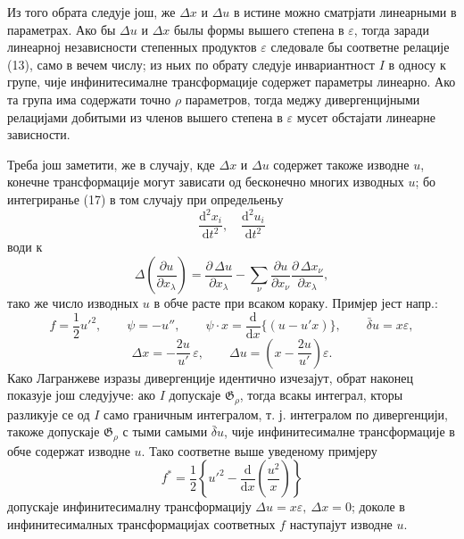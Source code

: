 ﻿\documentclass[11pt]{article}
\providecommand{\G}{\mathfrak G}
\providecommand{\eps}{\varepsilon}
\providecommand{\D}{\Delta}
\providecommand{\p}{\partial}
\providecommand{\dd}{\mathrm d}
\providecommand{\bd}{\bar{\delta}}
\begin{document}
Из того обрата следује још, же \(\D x\) и \(\D u\) в истине можно сматрјати линеарными в параметрах. Ако бы \(\D u\) и \(\D x\) былы формы вышего степена в \(\eps\), тогда заради линеарној независности степенных продуктов \(\eps\) следовале бы соответне релације (13), само в вечем числу; из ньих по обрату следује инвариантност \(I\) в односу к групе, чије инфинитесималне трансформације содержет параметры линеарно. Ако та група има содержати точно \(\rho\) параметров, тогда меджу дивергенцијными релацијами добитыми из членов вышего степена в \(\eps\) мусет обстајати линеарне зависности.

Треба још заметити, же в случају, кде \(\D x\) и \(\D u\) содержет такоже изводне \(u\), конечне трансформације могут зависати од бесконечно многих изводных \(u\); бо интегриранье (17) в том случају при определьеньу
\[
\frac{\dd^2x_i}{\dd t^2},\quad \frac{\dd^2u_i}{\dd t^2}
\]
води к
\[
\D\!\left(\frac{\p u}{\p x_\lambda}\right)
=\frac{\p\,\D u}{\p x_\lambda}
-\sum_\nu\frac{\p u}{\p x_\nu}
\frac{\p\,\D x_\nu}{\p x_\lambda},
\]
тако же число изводных \(u\) в обче расте при всаком кораку. Примјер јест напр.:
\[
f=\frac12 u'^2,\qquad
\psi=-u'',\qquad
\psi\cdot x=\frac{\dd}{\dd x}\{(u-u'x)\},\qquad
\bd u=x\eps,
\]
\[
\D x=-\frac{2u}{u'}\,\eps,\qquad
\D u=\left(x-\frac{2u}{u'}\right)\eps.
\]
Како Лагранжеве изразы дивергенције идентично изчезајут, обрат наконец показује још следујуче: ако \(I\) допускаје \(\G_\rho\), тогда всакы интеграл, кторы разликује се од \(I\) само граничным интегралом, т. ј. интегралом по дивергенцији, такоже допускаје \(\G_\rho\) с тыми самыми \(\bd u\), чије инфинитесималне трансформације в обче содержат изводне \(u\). Тако соответне выше уведеному примјеру
\[
f^*=\frac12\left\{u'^2-\frac{\dd}{\dd x}\left(\frac{u^2}{x}\right)\right\}
\]
допускаје инфинитесималну трансформацију \(\D u=x\eps,\ \D x=0\); доколе в инфинитесималных трансформацијах соответных \(f\) наступајут изводне \(u\).
\end{document}
